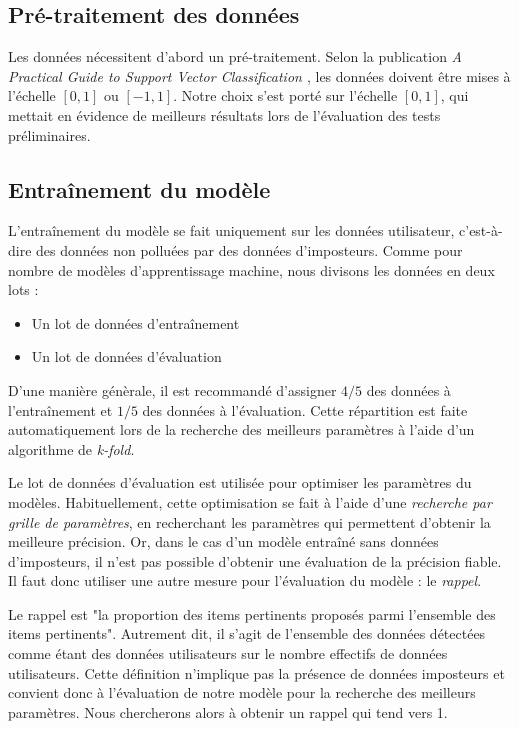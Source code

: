 \subsection{Pré-traitement des données}

Les données nécessitent d'abord un pré-traitement. Selon la publication \textit{A Practical Guide to Support Vector Classification \cite{svmpractical}}, les données doivent être mises à l'échelle $[0, 1]$ ou $[-1, 1]$. Notre choix s'est porté sur l'échelle $[0, 1]$, qui mettait en évidence de meilleurs résultats lors de l'évaluation des tests préliminaires.

\label{modele}
\subsection{Entraînement du modèle}

L'entraînement du modèle se fait uniquement sur les données utilisateur, c'est-à-dire des données non polluées par des données d'imposteurs. Comme pour nombre de modèles d'apprentissage machine, nous divisons les données en deux lots :

\begin{itemize}
    \item Un lot de données d'entraînement
    \item Un lot de données d'évaluation
\end{itemize}

D'une manière génèrale, il est recommandé d'assigner $4/5$ des données à l'entraînement et $1/5$ des données à l'évaluation. Cette répartition est faite automatiquement lors de la recherche des meilleurs paramètres à l'aide d'un algorithme de \textit{k-fold}.

Le lot de données d'évaluation est utilisée pour optimiser les paramètres du modèles. Habituellement, cette optimisation se fait à l'aide d'une \textit{recherche par grille de paramètres}, en recherchant les paramètres qui permettent d'obtenir la meilleure précision. Or, dans le cas d'un modèle entraîné sans données d'imposteurs, il n'est pas possible d'obtenir une évaluation de la précision fiable. Il faut donc utiliser une autre mesure pour l'évaluation du modèle : le \textit{rappel}.

Le rappel est "la proportion des items pertinents proposés parmi l'ensemble des items pertinents". Autrement dit, il s'agit de l'ensemble des données détectées comme étant des données utilisateurs sur le nombre effectifs de données utilisateurs. Cette définition n'implique pas la présence de données imposteurs et convient donc à l'évaluation de notre modèle pour la recherche des meilleurs paramètres. Nous chercherons alors à obtenir un rappel qui tend vers 1.

